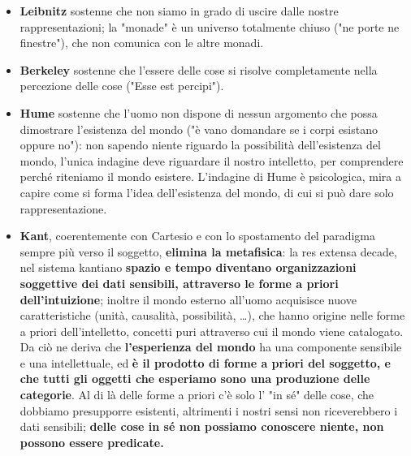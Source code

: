 \begin{itemize}
	\item \textbf{Leibnitz} sostenne che non siamo in grado di uscire dalle nostre rappresentazioni; la "monade" è un universo totalmente chiuso ("ne porte ne finestre"), che non comunica con le altre monadi.
	\item \textbf{Berkeley} sostenne che l'essere delle cose si risolve completamente nella percezione delle cose ("Esse est percipi").
	\item \textbf{Hume} sostenne che l'uomo non dispone di nessun argomento che possa dimostrare l'esistenza del mondo ("è vano domandare se i corpi esistano oppure no"): non sapendo niente riguardo la possibilità dell'esistenza del mondo, l'unica indagine deve riguardare il nostro intelletto, per comprendere perché riteniamo il mondo esistere. L'indagine di Hume è psicologica, mira a capire come si forma l'idea dell'esistenza del mondo, di cui si può dare solo rappresentazione.
	\item \textbf{Kant}, coerentemente con Cartesio e con lo spostamento del paradigma sempre più verso il soggetto, \textbf{elimina la metafisica}: la res extensa decade, nel sistema kantiano \textbf{spazio e tempo diventano organizzazioni soggettive dei dati sensibili, attraverso le forme a priori dell'intuizione}; inoltre il mondo esterno all'uomo acquisisce nuove caratteristiche (unità, causalità, possibilità, \dots), che hanno origine nelle forme a priori dell'intelletto, concetti puri attraverso cui il mondo viene catalogato. Da ciò ne deriva che \textbf{l'esperienza del mondo} ha una componente sensibile e una intellettuale, ed \textbf{è il prodotto di forme a priori del soggetto, e che tutti gli oggetti che esperiamo sono una produzione delle categorie}. Al di là delle forme a priori c'è solo l' "in sé" delle cose, che dobbiamo presupporre esistenti, altrimenti i nostri sensi non riceverebbero i dati sensibili; \textbf{delle cose in sé non possiamo conoscere niente, non possono essere predicate.}
\end{itemize}

